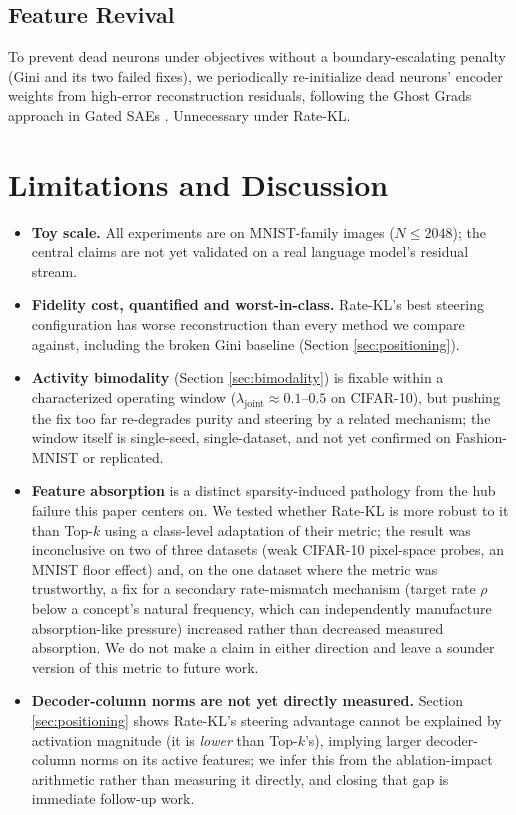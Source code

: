 \documentclass[11pt,twocolumn]{article}
\begin{document}
\subsection{Feature Revival}
\label{sec:hybrid}
To prevent dead neurons under objectives without a boundary-escalating penalty (Gini and its two failed fixes), we periodically re-initialize dead neurons' encoder weights from high-error reconstruction residuals, following the Ghost Grads approach in Gated SAEs \citep{lieberum2024gated}. Unnecessary under Rate-KL.

\section{Limitations and Discussion}
\label{sec:limitations}
\begin{itemize}
\item \textbf{Toy scale.} All experiments are on MNIST-family images ($N\le2048$); the central claims are not yet validated on a real language model's residual stream.
\item \textbf{Fidelity cost, quantified and worst-in-class.} Rate-KL's best steering configuration has worse reconstruction than every method we compare against, including the broken Gini baseline (Section \ref{sec:positioning}).
\item \textbf{Activity bimodality} (Section \ref{sec:bimodality}) is fixable within a characterized operating window ($\lambda_{\mathrm{joint}}\approx0.1$--$0.5$ on CIFAR-10), but pushing the fix too far re-degrades purity and steering by a related mechanism; the window itself is single-seed, single-dataset, and not yet confirmed on Fashion-MNIST or replicated.
\item \textbf{Feature absorption} \citep{chanin2024absorption} is a distinct sparsity-induced pathology from the hub failure this paper centers on. We tested whether Rate-KL is more robust to it than Top-$k$ using a class-level adaptation of their metric; the result was inconclusive on two of three datasets (weak CIFAR-10 pixel-space probes, an MNIST floor effect) and, on the one dataset where the metric was trustworthy, a fix for a secondary rate-mismatch mechanism (target rate $\rho$ below a concept's natural frequency, which can independently manufacture absorption-like pressure) increased rather than decreased measured absorption. We do not make a claim in either direction and leave a sounder version of this metric to future work.
\item \textbf{Decoder-column norms are not yet directly measured.} Section \ref{sec:positioning} shows Rate-KL's steering advantage cannot be explained by activation magnitude (it is \emph{lower} than Top-$k$'s), implying larger decoder-column norms on its active features; we infer this from the ablation-impact arithmetic rather than measuring it directly, and closing that gap is immediate follow-up work.

\end{itemize}
\end{document}
